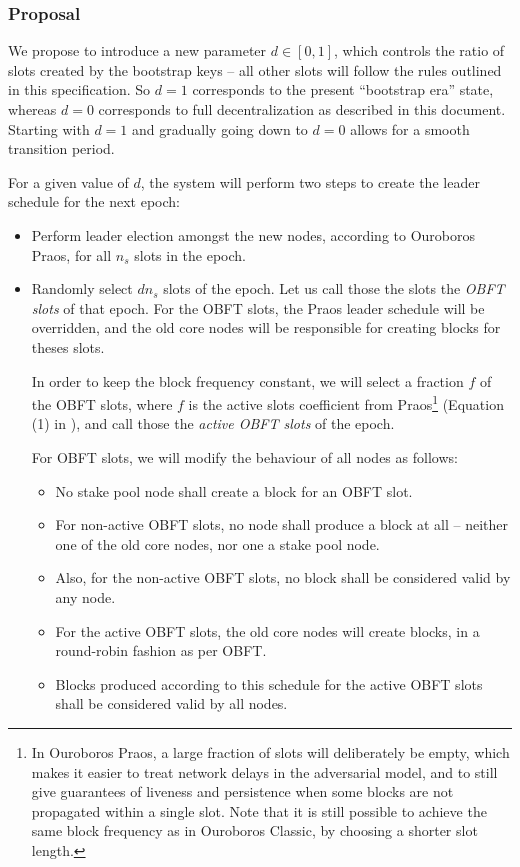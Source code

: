 \documentclass[11pt,a4paper,dvipsnames,twosided]{article}
\newcommand{\citep}[1]{\cite{#1}}
\begin{document}
\subsubsection{Proposal}
\label{proposal}

We propose to introduce a new parameter \(d\in[0,1]\), which controls
the ratio of slots created by the bootstrap keys -- all other slots will
follow the rules outlined in this specification. So \(d=1\) corresponds
to the present ``bootstrap era'' state, whereas \(d=0\) corresponds to
full decentralization as described in this document. Starting with
\(d=1\) and gradually going down to \(d=0\) allows for a smooth
transition period.

For a given value of \(d\), the system will perform two steps to create the
leader schedule for the next epoch:
\begin{itemize}
\item Perform leader election amongst the new nodes, according to Ouroboros
  Praos, for all \(n_s\) slots in the epoch.
\item Randomly select \(d n_s\) slots of the epoch. Let us call those the slots
  the \emph{OBFT slots} of that epoch. For the OBFT slots, the Praos leader
  schedule will be overridden, and the old core nodes will be responsible for
  creating blocks for theses slots.

  In order to keep the block frequency constant, we will select a fraction
  \(f\) of the OBFT slots, where \(f\) is the active slots coefficient from
  Praos\footnote{In Ouroboros Praos, a large fraction of slots will deliberately
  be empty, which makes it easier to treat network delays in the adversarial
  model, and to still give guarantees of liveness and persistence when some
  blocks are not propagated within a single slot. Note that it is still possible
  to achieve the same block frequency as in Ouroboros Classic, by choosing a
  shorter slot length.} (Equation (1) in \citep{ouroboros_praos}), and call
  those the \emph{active OBFT slots} of the epoch.

  For OBFT slots, we will modify the behaviour of all nodes as follows:
  \begin{itemize}
  \item
    No stake pool node shall create a block for an OBFT slot.
  \item
    For non-active OBFT slots, no node shall produce a block at all -- neither
    one of the old core nodes, nor one a stake pool node.
  \item
    Also, for the non-active OBFT slots, no block shall be considered valid by
    any node.
  \item For the active OBFT slots, the old core nodes will create blocks, in a
    round-robin fashion as per OBFT.
  \item
    Blocks produced according to this schedule for the active OBFT slots shall
    be considered valid by all nodes.
  \end{itemize}
\end{itemize}
\end{document}

